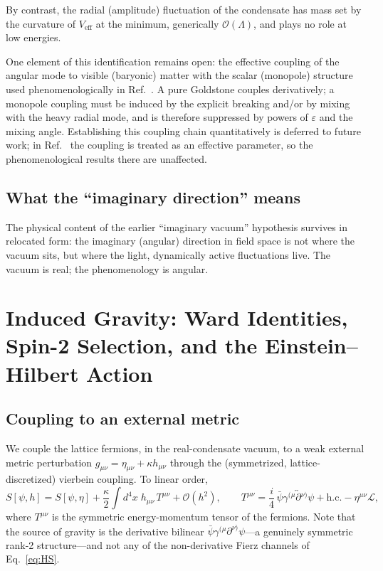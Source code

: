 \documentclass[11pt,a4paper]{article}
\begin{document}
By contrast, the radial (amplitude) fluctuation of the condensate
has mass set by the curvature of $V_{\mathrm{eff}}$ at the minimum,
generically $\mathcal{O}(\Lambda)$, and plays no role at low
energies.

One element of this identification remains open: the effective
coupling of the angular mode to visible (baryonic) matter with the
scalar (monopole) structure used phenomenologically in
Ref.~\cite{Cheng:2025sparc}.
A pure Goldstone couples derivatively; a monopole coupling must be
induced by the explicit breaking and/or by mixing with the heavy
radial mode, and is therefore suppressed by powers of
$\varepsilon$ and the mixing angle.
Establishing this coupling chain quantitatively is deferred to
future work; in Ref.~\cite{Cheng:2025sparc} the coupling is
treated as an effective parameter, so the phenomenological results
there are unaffected.

\subsection{What the ``imaginary direction'' means}

The physical content of the earlier ``imaginary vacuum''
hypothesis survives in relocated form: the imaginary (angular)
direction in field space is not where the vacuum sits, but where
the light, dynamically active fluctuations live.
The vacuum is real; the phenomenology is angular.


\section{Induced Gravity: Ward Identities, Spin-2 Selection, and
the Einstein--Hilbert Action}
\label{sec:induced}

\subsection{Coupling to an external metric}

We couple the lattice fermions, in the real-condensate vacuum, to a
weak external metric perturbation
$g_{\mu\nu} = \eta_{\mu\nu} + \kappa h_{\mu\nu}$ through the
(symmetrized, lattice-discretized) vierbein coupling.
To linear order,
\begin{equation}
S[\psi, h] = S[\psi, \eta]
+ \frac{\kappa}{2}\int d^4x\; h_{\mu\nu}\,T^{\mu\nu}
+ \mathcal{O}(h^2),
\qquad
T^{\mu\nu} = \frac{i}{4}\,\bar{\psi}\gamma^{(\mu}
\!\overleftrightarrow{\partial}{}^{\nu)}\psi + \mathrm{h.c.}
- \eta^{\mu\nu}\mathcal{L},
\label{eq:Tcoupling}
\end{equation}
where $T^{\mu\nu}$ is the symmetric energy-momentum tensor of the
fermions.
Note that the source of gravity is the derivative bilinear
$\bar{\psi}\gamma^{(\mu}\partial^{\nu)}\psi$---a genuinely
symmetric rank-2 structure---and not any of the non-derivative
Fierz channels of Eq.~\eqref{eq:HS}.
\end{document}
